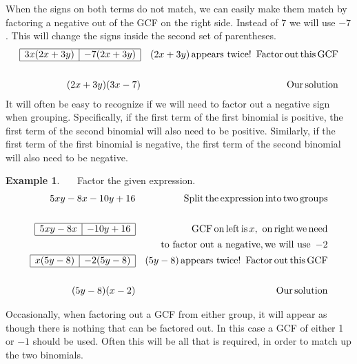 \documentclass[12pt]{book}
\theoremstyle{definition}
\newtheorem{example}{Example}
\newcommand{\tmop}[1]{\ensuremath{\operatorname{#1}}}
\begin{document}
When the signs on both terms do not match, we can easily make them match by factoring a negative out of the GCF on the right side. Instead of $7$ we will use $- 7$. This will change the signs inside the second set of parentheses.
  \begin{eqnarray*}
    \begin{array}{|l|l|}
      \hline
      3 x (2 x + 3 y) & - 7 (2 x + 3 y)\\
      \hline
    \end{array} &  & (2 x + 3 y) \tmop{appears~twice} !
    \tmop{~Factor} \tmop{out} \tmop{this} \tmop{GCF}\\
&&\\
    (2 x + 3 y) (3 x - 7) &  & \tmop{Our} \tmop{solution}
  \end{eqnarray*}
It will often be easy to recognize if we will need to factor out a negative sign when grouping. Specifically, if the first term of the first binomial is positive, the first term of the second binomial will also need to be positive. Similarly, if the first term of the first binomial is negative, the first term of the second binomial will also need to be negative.

\begin{example}~~~Factor the given expression.
  \begin{eqnarray*}
    5 x y - 8 x - 10 y + 16 &  & \tmop{Split} \tmop{the} \tmop{expression}
    \tmop{into} \tmop{two} \tmop{groups}\\
&&\\
    \begin{array}{|l|l|}
      \hline
      5 x y - 8 x & - 10 y + 16\\
      \hline
    \end{array} &  & \tmop{GCF} \tmop{on} \tmop{left} \tmop{is} x, \tmop{~on}
    \tmop{right} \tmop{we} \tmop{need}\\
		&& ~~~\tmop{to~factor~out~a~negative}, \tmop{we~will~use~} - 2\\
    \begin{array}{|l|l|}
      \hline
      x (5 y - 8) & - 2 (5 y - 8)\\
      \hline
    \end{array} &  & (5 y - 8) \tmop{appears~twice} !
    \tmop{~Factor} \tmop{out} \tmop{this} \tmop{GCF}\\
&&\\
    (5 y - 8) (x - 2) &  & \tmop{Our} \tmop{solution}
  \end{eqnarray*}
\end{example}
Occasionally, when factoring out a GCF from either group, it will appear as though there is nothing that can be factored out.  In this case a GCF of either 1 or $- 1$ should be used. Often this will be all that is required, in order to match up the two binomials.
\end{document}
